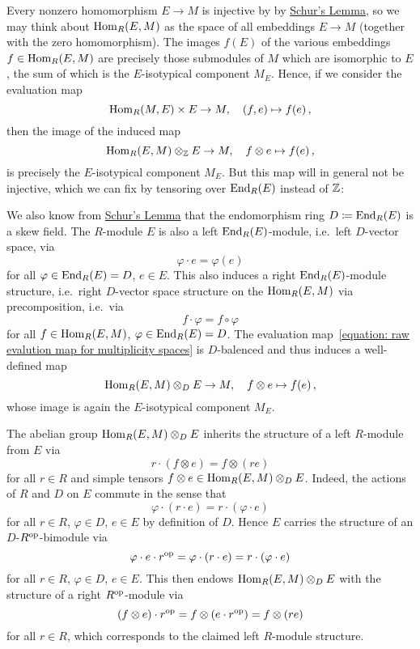 \begin{fluff}
  \label{fluff: introducting multiplicity spaces}
  Every nonzero homomorphism $E \to M$ is injective by by \hyperref[proposition: schurs lemma for modules]{Schur’s Lemma}, so we may think about $\operatorname{Hom}_R(E,M)$ as the space of all embeddings $E \to M$ (together with the zero homomorphism).
  The images $f(E)$ of the various embeddings $f \in \operatorname{Hom}_R(E,M)$ are precisely those submodules of $M$ which are isomorphic to $E$, the sum of which is the $E$-isotypical component $M_E$.
  Hence, if we consider the evaluation map
  \begin{equation}
    \label{equation: raw evalution map for multiplicity spaces}
            \operatorname{Hom}_R(M,E) \times E
    \to     M,
    \quad   (f, e)
    \mapsto f(e) \,,
  \end{equation}
  then the image of the induced map
  \[            
            \operatorname{Hom}_R(E,M) \otimes_{\mathbb{Z}} E
    \to     M,
    \quad   f \otimes e
    \mapsto f(e) \,,
  \]
  is precisely the $E$-isotypical component $M_E$.
  But this map will in general not be injective, which we can fix by tensoring over $\operatorname{End}_R(E)$ instead of $\mathbb{Z}$:
  
  We also know from \hyperref[proposition: schurs lemma for modules]{Schur’s Lemma} that the endomorphism ring $D \coloneqq \operatorname{End}_R(E)$ is a skew field.
  The $R$-module $E$ is also a left $\operatorname{End}_R(E)$-module, i.e.\ left $D$-vector space, via
  \[
      \varphi \cdot e
    = \varphi(e)
  \]
  for all $\varphi \in \operatorname{End}_R(E) = D$, $e \in E$.
  This also induces a right $\operatorname{End}_R(E)$-module structure, i.e.\ right $D$-vector space structure on the $\operatorname{Hom}_R(E,M)$ via precomposition, i.e.\ via
  \[
      f \cdot \varphi
    = f \circ \varphi
  \]
  for all $f \in \operatorname{Hom}_R(E,M)$, $\varphi \in \operatorname{End}_R(E) = D$.
  The evaluation map~\eqref{equation: raw evalution map for multiplicity spaces} is $D$-balenced and thus induces a well-defined map
  \[            
            \operatorname{Hom}_R(E,M) \otimes_D E
    \to     M,
    \quad   f \otimes e
    \mapsto f(e) \,,
  \]
  whose image is again the $E$-isotypical component $M_E$.
  
  The abelian group $\operatorname{Hom}_R(E,M) \otimes_D E$ inherits the structure of a left $R$-module from $E$ via
  \[
      r \cdot (f \otimes e)
    = f \otimes (r e)
  \]
  for all $r \in R$ and simple tensors $f \otimes e \in \operatorname{Hom}_R(E,M) \otimes_D E$.
  Indeed, the actions of $R$ and $D$ on $E$ commute in the sense that
  \[
      \varphi \cdot (r \cdot e)
    = r \cdot (\varphi \cdot e)
  \]
  for all $r \in R$, $\varphi \in D$, $e \in E$ by definition of $D$.
  Hence $E$ carries the structure of an $D$-$R^{\operatorname{op}}$-bimodule via
  \[
      \varphi \cdot e \cdot r^{\operatorname{op}}
    = \varphi \cdot (r \cdot e)
    = r \cdot (\varphi \cdot e)
  \]
  for all $r \in R$, $\varphi \in D$, $e \in E$.
  This then endows $\operatorname{Hom}_R(E,M) \otimes_D E$ with the structure of a right $R^{\operatorname{op}}$-module via
  \[
      (f \otimes e) \cdot r^{\operatorname{op}}
    = f \otimes (e \cdot r^{\operatorname{op}})
    = f \otimes (r e)
  \]
  for all $r \in R$, which corresponds to the claimed left $R$-module structure.
\end{fluff}



